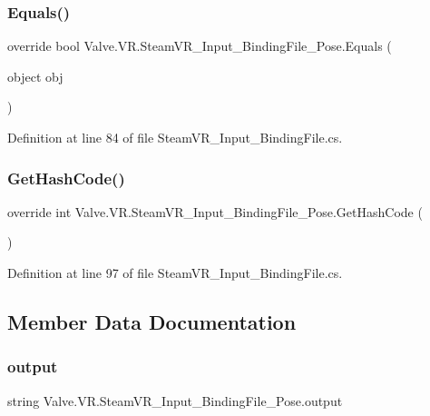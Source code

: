 \subsubsection{\texorpdfstring{Equals()}{Equals()}}
{\footnotesize\ttfamily override bool Valve.\+V\+R.\+Steam\+V\+R\+\_\+\+Input\+\_\+\+Binding\+File\+\_\+\+Pose.\+Equals (\begin{DoxyParamCaption}\item[{object}]{obj }\end{DoxyParamCaption})}



Definition at line 84 of file Steam\+V\+R\+\_\+\+Input\+\_\+\+Binding\+File.\+cs.

\mbox{\label{class_valve_1_1_v_r_1_1_steam_v_r___input___binding_file___pose_a1549f51c18e7ec8a554211a6572ca9f3}} 
\subsubsection{\texorpdfstring{GetHashCode()}{GetHashCode()}}
{\footnotesize\ttfamily override int Valve.\+V\+R.\+Steam\+V\+R\+\_\+\+Input\+\_\+\+Binding\+File\+\_\+\+Pose.\+Get\+Hash\+Code (\begin{DoxyParamCaption}{ }\end{DoxyParamCaption})}



Definition at line 97 of file Steam\+V\+R\+\_\+\+Input\+\_\+\+Binding\+File.\+cs.



\subsection{Member Data Documentation}
\mbox{\label{class_valve_1_1_v_r_1_1_steam_v_r___input___binding_file___pose_ad42251a952549a7d19b6efa3f8acb342}} 
\subsubsection{\texorpdfstring{output}{output}}
{\footnotesize\ttfamily string Valve.\+V\+R.\+Steam\+V\+R\+\_\+\+Input\+\_\+\+Binding\+File\+\_\+\+Pose.\+output}



